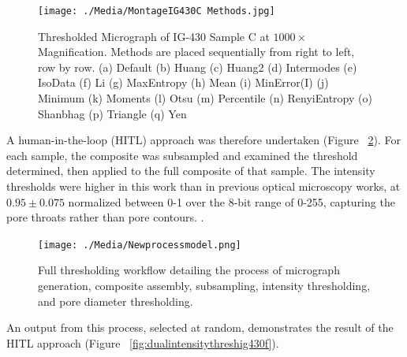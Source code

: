 \documentclass[review]{elsarticle}
\begin{document}
	\begin{figure}[!htbp]
		\centering
		\texttt{[image: ./Media/MontageIG430C Methods.jpg]}
		\caption{Thresholded Micrograph of IG-430 Sample C at $1000\times$ Magnification. Methods are placed sequentially from right to left, row by row. 
      (a) Default
			(b) Huang
			(c) Huang2
			(d) Intermodes
			(e) IsoData
			(f) Li
			(g) MaxEntropy
			(h) Mean
			(i) MinError(I)
			(j) Minimum
			(k) Moments
			(l) Otsu
			(m) Percentile
			(n) RenyiEntropy
			(o) Shanbhag
			(p) Triangle
			(q) Yen}
		\label{fig:Try All Thresholding Methods}
	\end{figure}  

	A human-in-the-loop (HITL) approach was therefore undertaken (Figure
	~\ref{fig:Final Workflow}). For each sample, the composite was subsampled and
	examined the threshold determined, then applied to the full composite of that
	sample. The intensity thresholds were higher in this work than in previous
	optical microscopy works, at $0.95 \pm 0.075$ normalized between 0-1 over the
	8-bit range of 0-255, capturing the pore throats rather than pore contours.
	\citep{Kane2011a,Huang2019}.


\begin{figure}[!htbp]
    \centering
    \texttt{[image: ./Media/Newprocessmodel.png]}
    \caption{Full thresholding workflow detailing the process of micrograph generation,
     composite assembly, subsampling, intensity thresholding, and pore diameter thresholding.}
    \label{fig:Final Workflow}
\end{figure}

An output from this process, selected at random, demonstrates the result of the
HITL approach (Figure ~\ref{fig:dualintensitythreshig430f}).
\end{document}
